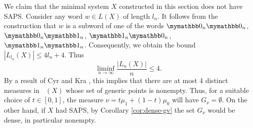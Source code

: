 \documentclass{amsart}
\theoremstyle{definition}
\DeclareMathOperator{\MT}{\mathcal{M}_{\mathit T} }
\begin{document}
We claim that the minimal system $X$ constructed in this section does not have SAPS.
Consider any word $w \in L(X)$ of length $l_n$.
It follows from the construction that $w$ is a subword of one of the words
$\zero_n \zero_n$,
$\zero_n \one_n$,
$\one_n \zero_n$,
$\one_n \one_n$.
Consequently, we obtain the bound $|L_{l_n}(X)| \le 4l_n + 4$. Thus
$$
	\liminf_{n \to \infty} \frac{|L_n(X)|}{n} \le 4.
$$
By a result of Cyr and Kra \cite[Theorem 1.1]{CyrKra}, this implies that there are at most 4 distinct measures in $\MT(X)$
whose set of generic points is nonempty.
Thus, for a suitable choice of $t \in [0, 1]$, the measure $\nu = t\mu_1 + (1-t) \mu_0$
will have $G_\nu = \emptyset$.
On the other hand, if $X$ had SAPS, by Corollary \ref{cor:dense-gv} the set $G_\nu$ would be dense, in particular nonempty.

































\nocite{WeissBook, KLO2}



%

\end{document}
